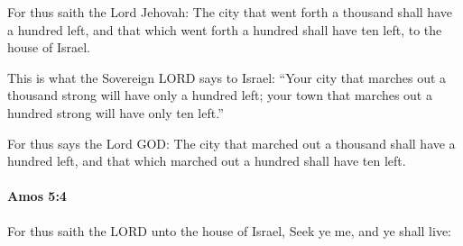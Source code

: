			\begin{versebox}
					\item[BHS] 
					\item[LXX] 
					\item[ASV] For thus saith the Lord Jehovah: The city that went forth a thousand shall have a hundred left, and that which went forth a hundred shall have ten left, to the house of Israel.
					\item[NIV] This is what the Sovereign LORD says to Israel: “Your city that marches out a thousand strong will have only a hundred left; your town that marches out a hundred strong will have only ten left.”
					\item[NRSV] For thus says the Lord GOD: The city that marched out a thousand shall have a hundred left, and that which marched out a hundred shall have ten left.
			\end{versebox}

		\paragraph{Amos 5:4} %
			\label{AMOS-5-4}

			For thus saith the LORD unto the house of Israel, Seek ye me, and ye shall live:

